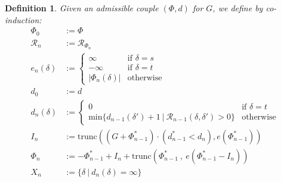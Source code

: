 \documentclass{article}
\theoremstyle{plain}
\newtheorem{definition}{Definition}
\theoremstyle{remark}
\begin{document}
\begin{definition}
Given an admissible couple $(\Phi, d)$ for $G$, we define by co-induction:
\begin{equation*}
\begin{split}
\Phi_0 &:= \Phi\\
\mathcal{R}_n&:= \mathcal{R}_{\Phi_n}\\
e_n(\delta)&:=
\begin{cases}
\infty &\text{if\ }\delta=s\\
-\infty &\text{if\ }\delta=t\\
|\Phi_n(\delta)| &\text{otherwise}
\end{cases}\\
d_0&:=d\\
d_n(\delta)&:=
\begin{cases}
0 &\text{if\ }\delta=t\\
 \mathrm{min}\big\{d_{n-1}(\delta') + 1\ |\  \mathcal{R}_{n-1}(\delta, \delta')>0\big\}&\text{otherwise}
\end{cases}\\
I_{n}&:= \mathrm{trunc}((G+\Phi^*_{n-1})\cdot(d_{n-1}^*<d_{n}),  e(\Phi_{n-1}^*))\\
\Phi_{n}&:= -\Phi_{n-1}^* + I_{n} + \mathrm{trunc}(\Phi_{n-1}^*\ ,\  e(\Phi_{n-1}^* - I_{n}))\\
X_n&:=\{\delta \ |\ d_n(\delta)=\infty\}
\end{split}
\end{equation*}
\end{definition}
\end{document}
